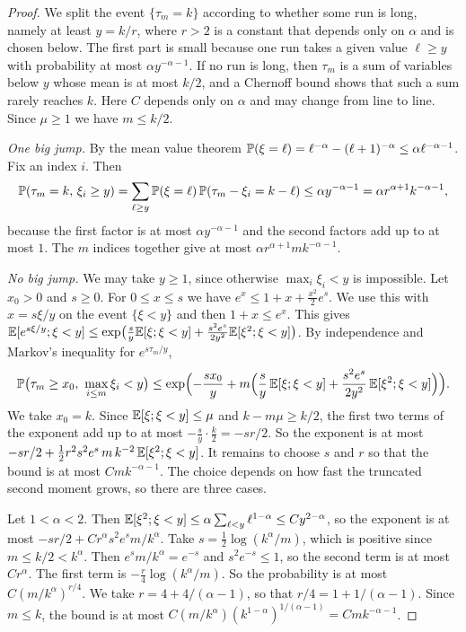 \begin{proof}
We split the event $\{\tau_m=k\}$ according to whether some run is long, namely at least
$y=k/r$, where $r>2$ is a constant that depends only on $\alpha$ and is chosen below. The
first part is small because one run takes a given value $\ell\ge y$ with probability at
most $\alpha y^{-\alpha-1}$. If no run is long, then $\tau_m$ is a sum of variables below $y$ whose mean is at most $k/2$,
and a Chernoff bound shows that such a sum rarely reaches $k$. Here $C$ depends only on
$\alpha$ and may change from line to line. Since $\mu\ge1$ we have $m\le k/2$.

\emph{One big jump.} By the mean value theorem
$\mathbb{P}(\xi=\ell)=\ell^{-\alpha}-(\ell+1)^{-\alpha}\le\alpha\ell^{-\alpha-1}$. Fix an
index $i$. Then
\[
\mathbb{P}(\tau_m=k,\,\xi_i\ge y)=\sum_{\ell\ge y}\mathbb{P}(\xi=\ell)\,\mathbb{P}(\tau_m-\xi_i=k-\ell)
\le\alpha y^{-\alpha-1}=\alpha r^{\alpha+1}k^{-\alpha-1},
\]
because the first factor is at most $\alpha y^{-\alpha-1}$ and the second factors add up
to at most $1$. The $m$ indices together give at most $\alpha r^{\alpha+1}mk^{-\alpha-1}$.

\emph{No big jump.} We may take $y\ge1$, since otherwise $\max_i\xi_i<y$ is impossible.
Let $x_0>0$ and $s\ge0$. For $0\le x\le s$ we have
$e^x\le1+x+\frac{x^2}2e^s$. We use this with $x=s\xi/y$ on the event $\{\xi<y\}$ and then
$1+x\le e^x$. This gives
$\mathbb{E}[e^{s\xi/y};\xi<y]\le\exp\bigl(\frac sy\mathbb{E}[\xi;\xi<y]+\frac{s^2e^s}{2y^2}\mathbb{E}[\xi^2;\xi<y]\bigr)$.
By independence and Markov's inequality for $e^{s\tau_m/y}$,
\begin{equation}\label{eq:C-chernoff}
\mathbb{P}\bigl(\tau_m\ge x_0,\ \max_{i\le m}\xi_i<y\bigr)
\le\exp\Bigl(-\frac{sx_0}y+m\Bigl(\frac sy\,\mathbb{E}[\xi;\xi<y]
+\frac{s^2e^s}{2y^2}\,\mathbb{E}[\xi^2;\xi<y]\Bigr)\Bigr).
\end{equation}
We take $x_0=k$. Since $\mathbb{E}[\xi;\xi<y]\le\mu$ and $k-m\mu\ge k/2$, the first two terms of
the exponent add up to at most $-\frac sy\cdot\frac k2=-sr/2$. So the exponent is at most
$-sr/2+\frac12r^2s^2e^s\,m\,k^{-2}\,\mathbb{E}[\xi^2;\xi<y]$. It remains to choose $s$ and $r$ so that the bound is at most $Cmk^{-\alpha-1}$. The
choice depends on how fast the truncated second moment grows, so there are three cases.

Let $1<\alpha<2$. Then $\mathbb{E}[\xi^2;\xi<y]\le\alpha\sum_{\ell<y}\ell^{1-\alpha}\le
Cy^{2-\alpha}$, so the exponent is at most $-sr/2+Cr^\alpha s^2e^sm/k^\alpha$. Take
$s=\frac12\log(k^\alpha/m)$, which is positive since $m\le k/2<k^\alpha$. Then
$e^sm/k^\alpha=e^{-s}$ and $s^2e^{-s}\le1$, so the second term is at most $Cr^\alpha$.
The first term is $-\frac r4\log(k^\alpha/m)$. So the probability is at most
$C(m/k^\alpha)^{r/4}$. We take $r=4+4/(\alpha-1)$, so that $r/4=1+1/(\alpha-1)$. Since
$m\le k$, the bound is at most
$C(m/k^\alpha)(k^{1-\alpha})^{1/(\alpha-1)}=Cmk^{-\alpha-1}$.


\end{proof}
